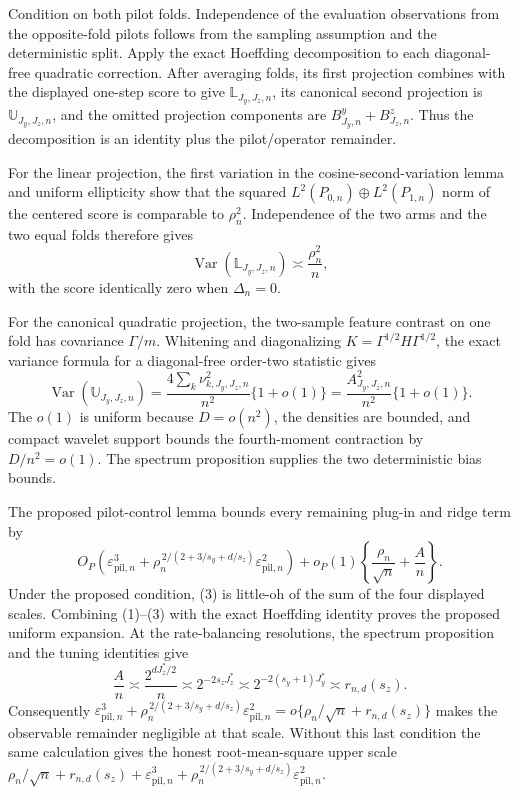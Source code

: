 Condition on both pilot folds.  Independence of the evaluation observations from the opposite-fold pilots follows from the sampling assumption and the deterministic split.  Apply the exact Hoeffding decomposition to each diagonal-free quadratic correction.  After averaging folds, its first projection combines with the displayed one-step score to give \(\mathbb L_{J_y,J_z,n}\), its canonical second projection is \(\mathbb U_{J_y,J_z,n}\), and the omitted projection components are \(B^y_{J_y,n}+B^z_{J_z,n}\).  Thus the decomposition is an identity plus the pilot/operator remainder.

For the linear projection, the first variation in the cosine-second-variation lemma and uniform ellipticity show that the squared \(L^2(P_{0,n})\oplus L^2(P_{1,n})\) norm of the centered score is comparable to \(\rho_n^2\).  Independence of the two arms and the two equal folds therefore gives
\[
 \operatorname{Var}(\mathbb L_{J_y,J_z,n})\asymp\frac{\rho_n^2}{n}, \tag{1}
\]
with the score identically zero when \(\Delta_n=0\).

For the canonical quadratic projection, the two-sample feature contrast on one fold has covariance \(\Gamma/m\).  Whitening and diagonalizing \(K=\Gamma^{1/2}H\Gamma^{1/2}\), the exact variance formula for a diagonal-free order-two statistic gives
\[
 \operatorname{Var}(\mathbb U_{J_y,J_z,n})
 =\frac{4\sum_k\nu_{k,J_y,J_z,n}^2}{n^2}\{1+o(1)\}
 =\frac{A_{J_y,J_z,n}^2}{n^2}\{1+o(1)\}.                \tag{2}
\]
The \(o(1)\) is uniform because \(D=o(n^2)\), the densities are bounded, and compact wavelet support bounds the fourth-moment contraction by \(D/n^2=o(1)\).  The spectrum proposition supplies the two deterministic bias bounds.

The proposed pilot-control lemma bounds every remaining plug-in and ridge term by
\[
 O_P(\varepsilon_{\mathrm{pil},n}^3+
 \rho_n^{\,2/(2+3/s_y+d/s_z)}\varepsilon_{\mathrm{pil},n}^2)
 +o_P(1)\left\{\frac{\rho_n}{\sqrt n}+\frac A n\right\}. \tag{3}
\]
Under the proposed condition, (3) is little-oh of the sum of the four displayed scales.  Combining (1)--(3) with the exact Hoeffding identity proves the proposed uniform expansion.  At the rate-balancing resolutions, the spectrum proposition and the tuning identities give
\[
 \frac A n\asymp\frac{2^{dJ_z^*/2}}n
 \asymp2^{-2s_zJ_z^*}
 \asymp2^{-2(s_y+1)J_y^*}
 \asymp r_{n,d}(s_z).                                   \tag{4}
\]
Consequently \(\varepsilon_{\mathrm{pil},n}^3+\rho_n^{\,2/(2+3/s_y+d/s_z)}\varepsilon_{\mathrm{pil},n}^2=o\{\rho_n/\sqrt n+r_{n,d}(s_z)\}\) makes the observable remainder negligible at that scale.  Without this last condition the same calculation gives the honest root-mean-square upper scale \(\rho_n/\sqrt n+r_{n,d}(s_z)+\varepsilon_{\mathrm{pil},n}^3+\rho_n^{\,2/(2+3/s_y+d/s_z)}\varepsilon_{\mathrm{pil},n}^2\).